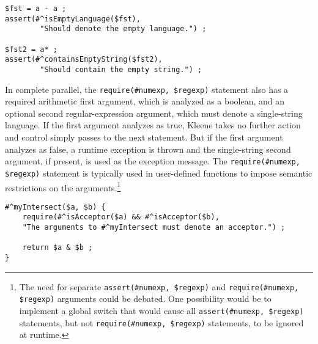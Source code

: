 \begin{Verbatim}[fontsize=\small]
$fst = a - a ;
assert(#^isEmptyLanguage($fst), 
        "Should denote the empty language.") ;

$fst2 = a* ;
assert(#^containsEmptyString($fst2), 
        "Should contain the empty string.") ;
\end{Verbatim}

In complete parallel, the \verb!require(#numexp, $regexp)! statement also has a required arithmetic first
argument, which is analyzed as a boolean, and an optional second
regular-expression argument, which must denote a single-string language.  If
the first argument analyzes as true, Kleene takes no further action and control simply passes to the next
statement.  But if the first argument analyzes as false, a runtime exception is thrown and
the single-string second argument, if present, is used as the exception
message.  The \verb!require(#numexp, $regexp)! statement is typically used
in user-defined functions to impose semantic restrictions on the
arguments.\footnote{The need for separate \verb!assert(#numexp, $regexp)!
and \verb!require(#numexp, $regexp)! arguments could be debated.  One
possibility would be to implement a global switch that would cause all
\verb!assert(#numexp, $regexp)! statements, but not 
\verb!require(#numexp, $regexp)! statements, to be ignored at runtime.}

\begin{Verbatim}[fontsize=\small]
#^myIntersect($a, $b) {
	require(#^isAcceptor($a) && #^isAcceptor($b), 
    "The arguments to #^myIntersect must denote an acceptor.") ;

	return $a & $b ;
}
\end{Verbatim}


